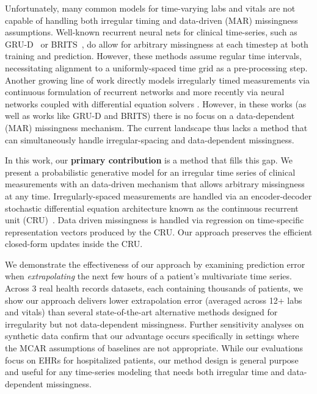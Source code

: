 Unfortunately, many common models for time-varying labs and vitals are not capable of handling both irregular timing and data-driven (MAR) missingness assumptions.
Well-known recurrent neural nets for clinical time-series, such as GRU-D~\citep{che2018recurrent} or BRITS~\citep{caoBRITSBidirectionalRecurrent2018}, do allow for arbitrary missingness at each timestep at both training and prediction.
However, these methods assume regular time intervals, necessitating alignment to a uniformly-spaced time grid as a pre-processing step.
Another growing line of work directly models irregularly timed measurements via continuous formulation of recurrent networks \citep{pineda1987generalization, pearlmutter1989learning} and more recently via neural networks coupled with differential equation solvers \citep{de2019gru, rubanova2019latent}. However, in these works (as well as works like GRU-D and BRITS) there is no focus on a data-dependent (MAR) missingness mechanism. The current landscape thus lacks a method that can simultaneously handle irregular-spacing and data-dependent missingness.

In this work, our \textbf{primary contribution} is a method that fills this gap. We present a probabilistic generative model for an irregular time series of clinical measurements with an data-driven mechanism that allows arbitrary missingness at any time. 
Irregularly-spaced measurements are handled via an encoder-decoder stochastic differential equation architecture known as the continuous recurrent unit (CRU)~\citep{schirmer2022modeling}. Data driven missingness is handled via regression on time-specific representation vectors produced by the CRU. Our approach  preserves the efficient closed-form updates inside the CRU.

We demonstrate the effectiveness of our approach by examining prediction error
when \emph{extrapolating} the next few hours of a patient's multivariate time series. Across 3 real health records datasets, each containing thousands of patients, we show our approach delivers lower extrapolation error (averaged across 12+ labs and vitals) than several state-of-the-art alternative methods designed for irregularity but not data-dependent missingness. Further sensitivity analyses on synthetic data confirm that our advantage occurs specifically in settings where the MCAR assumptions of baselines are not appropriate.
While our evaluations focus on EHRs for hospitalized patients, our method design is general purpose and useful for any time-series modeling that needs both irregular time and data-dependent missingness.

